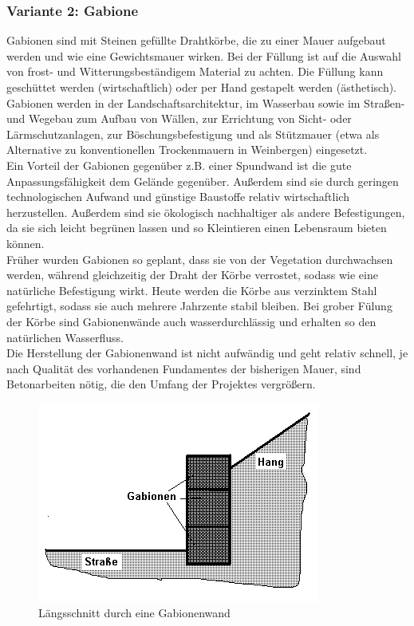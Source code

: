 \documentclass[11pt,fleqn,a4paper,halfparskip]{article}
\begin{document}
\subsubsection*{Variante 2: Gabione}
Gabionen sind mit Steinen gefüllte Drahtkörbe, die zu einer Mauer aufgebaut werden und wie eine Gewichtsmauer wirken. Bei der Füllung ist auf die Auswahl von frost- und Witterungsbeständigem Material zu achten. Die Füllung kann geschüttet werden (wirtschaftlich) oder per Hand gestapelt werden (ästhetisch). Gabionen werden in der Landschaftsarchitektur, im Wasserbau sowie im Straßen- und Wegebau zum Aufbau von Wällen, zur Errichtung von Sicht- oder Lärmschutzanlagen, zur Böschungsbefestigung und als Stützmauer (etwa als Alternative zu konventionellen Trockenmauern in Weinbergen) eingesetzt. \\
Ein Vorteil der Gabionen gegenüber z.B. einer Spundwand ist die gute Anpassungsfähigkeit dem Gelände gegenüber. Außerdem sind sie durch geringen technologischen Aufwand und günstige Baustoffe relativ wirtschaftlich herzustellen. Außerdem sind sie ökologisch nachhaltiger als andere Befestigungen, da sie sich leicht begrünen lassen und so Kleintieren einen Lebensraum bieten können. \\
Früher wurden Gabionen so geplant, dass sie von der Vegetation durchwachsen werden, während gleichzeitig der Draht der Körbe verrostet, sodass wie eine natürliche Befestigung wirkt. Heute werden die Körbe aus verzinktem Stahl gefehrtigt, sodass sie auch mehrere Jahrzente stabil bleiben. Bei grober Fülung der Körbe sind Gabionenwände auch wasserdurchlässig und erhalten so den natürlichen Wasserfluss.\\
Die Herstellung der Gabionenwand ist nicht aufwändig und geht relativ schnell, je nach Qualität des vorhandenen Fundamentes der bisherigen Mauer, sind Betonarbeiten nötig, die den Umfang der Projektes vergrößern.
\begin{figure}[h!]
\includegraphics[scale=0.8]{Gabionenwand.png}
\caption{Längsschnitt durch eine Gabionenwand \cite{gabio}}
\end{figure}
\end{document}
